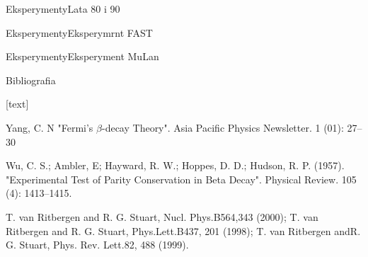 \documentclass{beamer}
\begin{document}
\begin{frame}{Eksperymenty}{Lata 80 i 90}

\end{frame}

\begin{frame}{Eksperymenty}{Eksperymrnt FAST}

\end{frame}

\begin{frame}{Eksperymenty}{Eksperyment MuLan}

\end{frame}


\begin{frame}{Bibliografia}

    \begin{thebibliography}{9}
        [text]

         Yang, C. N  "Fermi's $\beta$-decay Theory". Asia Pacific Physics Newsletter. 1 (01): 27–30

          Wu, C. S.; Ambler, E; Hayward, R. W.; Hoppes, D. D.; Hudson, R. P. (1957). "Experimental Test of Parity Conservation in Beta Decay". Physical Review. 105 (4): 1413–1415.

         T. van Ritbergen and R. G. Stuart, Nucl. Phys.B564,343 (2000); T. van Ritbergen and R. G. Stuart, Phys.Lett.B437,  201  (1998);   T. van  Ritbergen  andR. G. Stuart, Phys. Rev. Lett.82, 488 (1999).

    \end{thebibliography}

\end{frame}
\end{document}
